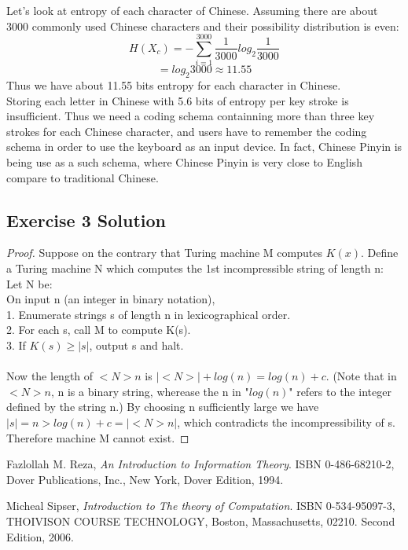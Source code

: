 \documentclass[12pt]{article}
\begin{document}
Let's look at entropy of each character of Chinese. Assuming there are about 3000 commonly used Chinese characters and their possibility distribution is even: 
\[
	H(X_c) = -\sum_{i=1}^{3000}\frac{1}{3000}log_{2}\frac{1}{3000}
\]
\[
	= log_{2}3000 \approx 11.55
\]
Thus we have about 11.55 bits entropy for each character in Chinese.\\
Storing each letter in Chinese with 5.6 bits of entropy per key stroke is insufficient. Thus we need a coding schema containning more than three key strokes for each Chinese character, and users have to remember the coding schema in order to use the keyboard as an input device. In fact, Chinese Pinyin is being use as a such schema, where Chinese Pinyin is very close to English compare to traditional Chinese.\\

\subsection{Exercise 3 Solution}
\begin{proof}
Suppose on the contrary that Turing machine M computes $K(x)$. Define a
Turing machine N which computes the 1st incompressible string of
length n:\\

Let N be:\\
On input n (an integer in binary notation),\\
1. Enumerate strings s of length n in lexicographical order.\\
2. For each s, call M to compute K(s).\\
3. If $K(s) \geq |s|$, output s and halt.\\
\\
Now the length of $<N>n$ is $|<N>| + log(n) = log(n) + c$. (Note that in
$<N>n$, n is a binary string, wherease the n in "$log(n)$" refers to the
integer defined by the string n.) By choosing n sufficiently large we
have $|s| = n > log(n) + c = |<N>n|$, which contradicts the
incompressibility of s. Therefore machine M cannot exist.
\end{proof}

\begin{thebibliography}{9}

  Fazlollah M. Reza,
  \emph{An Introduction to Information Theory}.
  ISBN 0-486-68210-2,
  Dover Publications, Inc., New York,
  Dover Edition,
  1994.

  Micheal Sipser,
  \emph{Introduction to The theory of Computation}.
  ISBN 0-534-95097-3,
  THOIVISON COURSE TECHNOLOGY, Boston, Massachusetts, 02210.
  Second Edition,
  2006.

\end{thebibliography}

	
\end{document}
